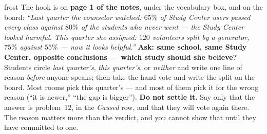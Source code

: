 \documentclass[10pt]{article}
\begin{document}
\boxguard
\begin{skillbox}{frost}
The hook is on \textbf{page 1 of the notes}, under the vocabulary box, and on the board:
\textit{``Last quarter the counselor watched: $65\%$ of Study Center users passed every class
against $80\%$ of the students who never went --- the Study Center looked harmful. This
quarter she assigned: $120$ volunteers split by a generator, $75\%$ against $55\%$ --- now it
looks helpful.''} \textbf{Ask: same school, same Study Center, opposite conclusions --- which
study should she believe?} Students circle \emph{last quarter's}, \emph{this quarter's}, or
\emph{neither} and write one line of reason \emph{before} anyone speaks; then take the hand
vote and write the split on the board. Most rooms pick this quarter's --- and most of them
pick it for the wrong reason (``it is newer,'' ``the gap is bigger'').
\textbf{Do not settle it.} Say only that the answer is problem~12, in the \emph{Caused} row,
and that they will vote again there. The reason matters more than the verdict, and you cannot
show that until they have committed to one.
\end{skillbox}
\end{document}
